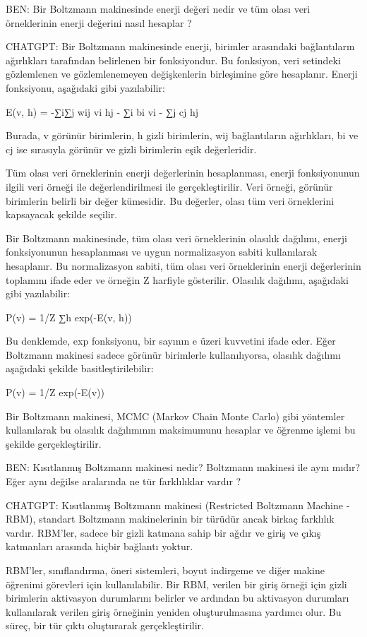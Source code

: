 \documentclass[11pt]{article}
\begin{document}
BEN: Bir Boltzmann makinesinde enerji değeri nedir ve tüm olası veri örneklerinin enerji değerini nasıl hesaplar ?

CHATGPT: 
Bir Boltzmann makinesinde enerji, birimler arasındaki bağlantıların ağırlıkları tarafından belirlenen bir fonksiyondur. Bu fonksiyon, veri setindeki gözlemlenen ve gözlemlenemeyen değişkenlerin birleşimine göre hesaplanır. Enerji fonksiyonu, aşağıdaki gibi yazılabilir:

E(v, h) = -∑i∑j wij vi hj - ∑i bi vi - ∑j cj hj

Burada, v görünür birimlerin, h gizli birimlerin, wij bağlantıların ağırlıkları, bi ve cj ise sırasıyla görünür ve gizli birimlerin eşik değerleridir.

Tüm olası veri örneklerinin enerji değerlerinin hesaplanması, enerji fonksiyonunun ilgili veri örneği ile değerlendirilmesi ile gerçekleştirilir. Veri örneği, görünür birimlerin belirli bir değer kümesidir. Bu değerler, olası tüm veri örneklerini kapsayacak şekilde seçilir.

Bir Boltzmann makinesinde, tüm olası veri örneklerinin olasılık dağılımı, enerji fonksiyonunun hesaplanması ve uygun normalizasyon sabiti kullanılarak hesaplanır. Bu normalizasyon sabiti, tüm olası veri örneklerinin enerji değerlerinin toplamını ifade eder ve örneğin Z harfiyle gösterilir. Olasılık dağılımı, aşağıdaki gibi yazılabilir:

P(v) = 1/Z ∑h exp(-E(v, h))

Bu denklemde, exp fonksiyonu, bir sayının e üzeri kuvvetini ifade eder. Eğer Boltzmann makinesi sadece görünür birimlerle kullanılıyorsa, olasılık dağılımı aşağıdaki şekilde basitleştirilebilir:

P(v) = 1/Z exp(-E(v))

Bir Boltzmann makinesi, MCMC (Markov Chain Monte Carlo) gibi yöntemler kullanılarak bu olasılık dağılımının maksimumunu hesaplar ve öğrenme işlemi bu şekilde gerçekleştirilir.

BEN: Kısıtlanmış Boltzmann makinesi nedir? Boltzmann makinesi ile aynı mıdır? Eğer aynı değilse aralarında ne tür farklılıklar vardır ?

CHATGPT: Kısıtlanmış Boltzmann makinesi (Restricted Boltzmann Machine - RBM), standart Boltzmann makinelerinin bir türüdür ancak birkaç farklılık vardır. RBM'ler, sadece bir gizli katmana sahip bir ağdır ve giriş ve çıkış katmanları arasında hiçbir bağlantı yoktur.

RBM'ler, sınıflandırma, öneri sistemleri, boyut indirgeme ve diğer makine öğrenimi görevleri için kullanılabilir. Bir RBM, verilen bir giriş örneği için gizli birimlerin aktivasyon durumlarını belirler ve ardından bu aktivasyon durumları kullanılarak verilen giriş örneğinin yeniden oluşturulmasına yardımcı olur. Bu süreç, bir tür çıktı oluşturarak gerçekleştirilir.
\end{document}
